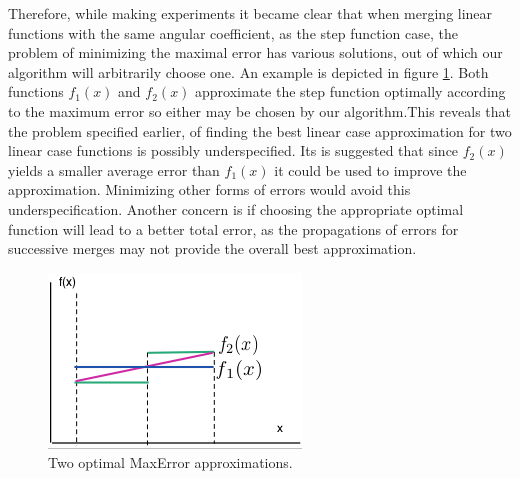 Therefore, while making experiments it became clear that when merging linear functions with the same angular coefficient, as the step function case, the problem of minimizing the maximal error has various solutions, out of which our algorithm will arbitrarily choose one. An example is depicted in figure \ref{steplin2}. Both functions $f_1(x)$ and $f_2(x)$ approximate the step function optimally according to the maximum error so either may be chosen by our algorithm.This reveals that the problem specified earlier, of finding the best linear case approximation for two linear case functions is possibly underspecified.  Its is suggested that since $f_2(x)$ yields a smaller average error than $f_1(x)$ it could be used to improve the approximation. Minimizing other forms of errors would avoid this underspecification. Another concern is if choosing the appropriate optimal function will lead to a better total error, as the propagations of errors for successive merges may not provide the overall best approximation.
\begin{figure}[h]
\center
\includegraphics[scale=0.9]{Figures/step2lin.png}
\caption{Two optimal MaxError approximations.}
\label{steplin2} 
\end{figure}
